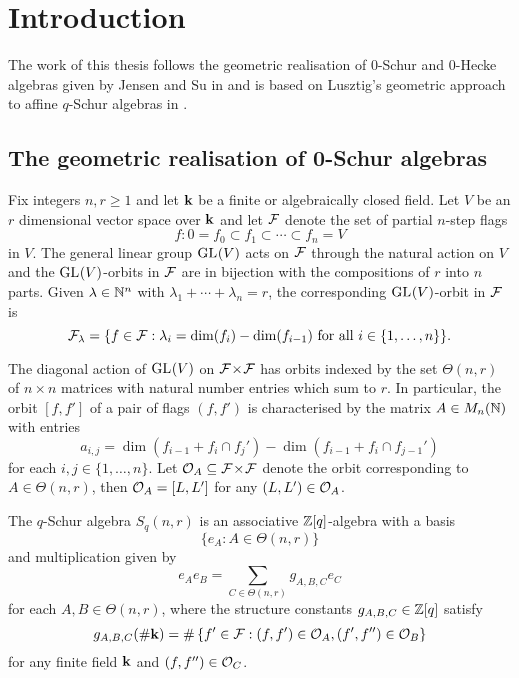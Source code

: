 \documentclass[a4paper, 11pt, twoside]{report}
\begin{document}
\afterpage{\blankpage}

\tableofcontents

\chapter{Introduction}

The work of this thesis follows the geometric realisation of $0$-Schur and $0$-Hecke algebras given by Jensen and Su in \cite{su15} and is based on Lusztig's geometric approach to affine $q$-Schur algebras in \cite{lusztig99}.

\section{The geometric realisation of 0-Schur algebras}

Fix integers $n,r\geq 1$ and let $\mathbf{k}$ be a finite or algebraically closed field. Let $V$ be an $r$ dimensional vector space over $\mathbf{k}$ and let $\mathcal{F}$ denote the set of partial $n$-step flags
\begin{equation*}
f\colon 0=f_0\subset f_1\subset\cdots\subset f_n=V
\end{equation*}
in $V$. The general linear group $\operatorname{GL}_{}(V)$ acts on $\mathcal{F}$ through the natural action on $V$ and the $\operatorname{GL}_{}(V)$-orbits in $\mathcal{F}$ are in bijection with the compositions of $r$ into $n$ parts. Given $\lambda\in\mathbb{N}^n$ with $\lambda_1+\cdots +\lambda_n=r$, the corresponding $\operatorname{GL}_{}(V)$-orbit in $\mathcal{F}$ is
\begin{equation*}
\mathcal{F}_\lambda = \{f\in\mathcal{F}:\lambda_i=\dim(f_i)-\dim(f_{i-1})\text{ for all }i\in\{1,\ldots,n\}\}.
\end{equation*}

The diagonal action of $\operatorname{GL}_{}(V)$ on ${\mathcal{F}\!\times\!\mathcal{F}}$ has orbits indexed by the set $\Theta(n,r)$ of $n\times n$ matrices with natural number entries which sum to $r$. In particular, the orbit $[f,f']$ of a pair of flags $(f,f')$ is characterised by the matrix $A\in M_n(\mathbb{N})$ with entries
\begin{equation*}
a_{i,j} = \dim(f_{i-1} + f_i\cap f_j') - \dim(f_{i-1} + f_i\cap f_{j-1}')
\end{equation*}
for each $i,j\in\{1,\ldots,n\}$. Let $\mathcal{O}_{A}\subseteq{\mathcal{F}\!\times\!\mathcal{F}}$ denote the orbit corresponding to $A\in\Theta(n,r)$, then $\mathcal{O}_{A}=[L,L']$ for any $(L,L')\in\mathcal{O}_{A}$.

The $q$-Schur algebra $S_q(n,r)$ is an associative $\mathbb{Z}[q]$-algebra with a basis
\begin{equation*}
\{e_A:A\in\Theta(n,r)\}
\end{equation*}
and multiplication given by
\begin{equation*}
e_Ae_B = \sum_{C\in\Theta(n,r)}g_{A,B,C}e_C
\end{equation*}
for each $A,B\in\Theta(n,r)$, where the structure constants $g_{A,B,C}\in\mathbb{Z}[q]$ satisfy
\begin{equation*}
g_{A,B,C}(\#\mathbf{k}) = \#\left\{ f'\in\mathcal{F}: (f,f')\in\mathcal{O}_{A}, (f',f'')\in\mathcal{O}_{B}\right\}
\end{equation*}
for any finite field $\mathbf{k}$ and $(f,f'')\in\mathcal{O}_{C}$.
\end{document}
